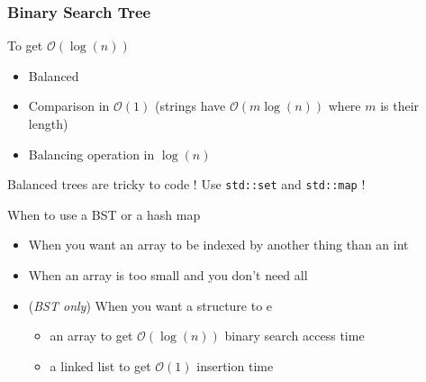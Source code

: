\documentclass[10pt,svgnames,usenames,table]{beamer} %
\newcommand{\bigoh}{\mathcal{O}}
\begin{document}
\begin{frame}
  \frametitle{Binary Search Tree}
  \begin{center}
\end{center}
  \framebreak

  To get $\bigoh(\log(n))$
  \begin{itemize}
    \item Balanced
    \item Comparison in $\bigoh(1)$ (strings have $\bigoh(m\log(n))$ where $m$ is their length)
    \item Balancing operation in $\log(n)$
  \end{itemize}
  Balanced trees are tricky to code ! Use \lstinline|std::set| and \lstinline|std::map| !

  \begin{block}{When to use a BST or a hash map}
    \begin{itemize}
      \item When you want an array to be indexed by another thing than an int %
      \item When an array is too small and you don't need all %
      \item (\emph{BST only})
        When you want a structure to e
        \begin{itemize}
          \item an array to get $\bigoh(\log(n))$ binary search access time
          \item a linked list to get $\bigoh(1)$ insertion time
        \end{itemize}
    \end{itemize}
  \end{block}
\end{frame}
\end{document}
